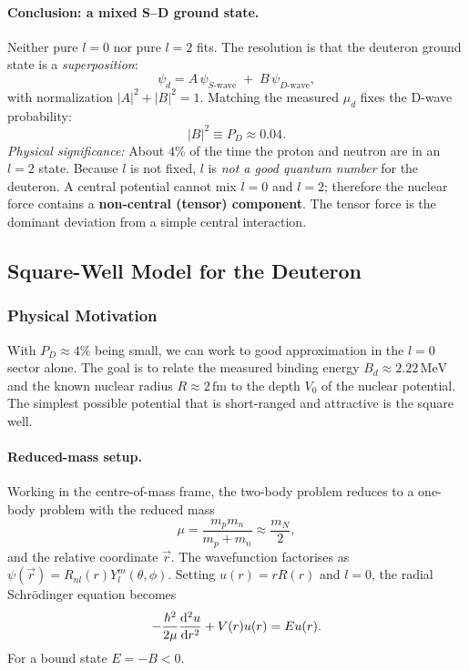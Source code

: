 \paragraph{Conclusion: a mixed S–D ground state.}
Neither pure $l=0$ nor pure $l=2$ fits.  The resolution is that the deuteron
ground state is a \emph{superposition}:
\begin{equation}
  \label{eq:lec04:psi_d}
  \psi_d = A\,\psi_{S\text{-wave}}\;+\;B\,\psi_{D\text{-wave}},
\end{equation}
with normalization $|A|^2+|B|^2=1$.  Matching the measured $\mu_d$ fixes the
D-wave probability:
\begin{equation}
  \label{eq:lec04:d_wave}
  \boxed{|B|^2 \equiv P_D \approx 0.04.}
\end{equation}
\textit{Physical significance:} About $4\%$ of the time the proton and neutron
are in an $l=2$ state.  Because $l$ is not fixed, $l$ is \emph{not a good
quantum number} for the deuteron.  A central potential cannot mix $l=0$ and
$l=2$; therefore the nuclear force contains a \textbf{non-central (tensor)
component}.  The tensor force is the dominant deviation from a simple central
interaction.

\subsection{Square-Well Model for the Deuteron}

\subsubsection*{Physical Motivation}
With $P_D\approx4\%$ being small, we can work to good approximation in the
$l=0$ sector alone.  The goal is to relate the measured binding energy
$B_d\approx2.22\,\mathrm{MeV}$ and the known nuclear radius $R\approx2\,\mathrm{fm}$
to the depth $V_0$ of the nuclear potential.  The simplest possible potential that
is short-ranged and attractive is the square well.

\paragraph{Reduced-mass setup.}
Working in the centre-of-mass frame, the two-body problem reduces to a
one-body problem with the reduced mass
\begin{equation}
  \label{eq:lec04:reduced_mass}
  \mu = \frac{m_p m_n}{m_p+m_n}\approx\frac{m_N}{2},
\end{equation}
and the relative coordinate $\vec{r}$.  The wavefunction factorises as
$\psi(\vec{r})=R_{nl}(r)Y_l^m(\theta,\phi)$.  Setting $u(r)=r R(r)$ and
$l=0$, the radial Schrödinger equation becomes
\begin{equation}
  \label{eq:lec04:radial_eq}
  -\frac{\hbar^2}{2\mu}\dv[2]{u}{r}+V(r)u(r)=Eu(r).
\end{equation}
For a bound state $E=-B<0$.

